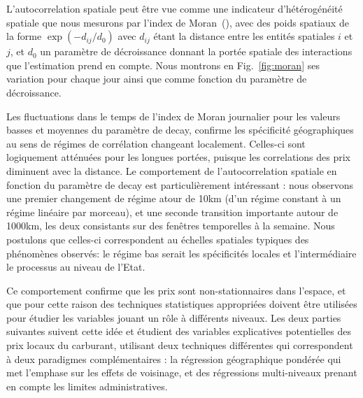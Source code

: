 {L'autocorrelation spatiale peut être vue comme une indicateur d'hétérogénéité spatiale que nous mesurons par l'index de Moran~(\cite{tsai2005quantifying}), avec des poids spatiaux de la forme $\exp{\left(-d_{ij} / d_0 \right)}$ avec  $d_{ij}$ étant la distance entre les entités spatiales $i$ et $j$, et $d_0$ un paramètre de décroissance donnant la portée spatiale des interactions que l'estimation prend en compte. Nous montrons en Fig.~\ref{fig:moran} ses variation pour chaque jour ainsi que comme fonction du paramètre de décroissance.

Les fluctuations dans le temps de l'index de Moran journalier pour les valeurs basses et moyennes du paramètre de decay, confirme les spécificité géographiques au sens de régimes de corrélation changeant localement. Celles-ci sont logiquement atténuées pour les longues portées, puisque les correlations des prix diminuent avec la distance. Le comportement de l'autocorrelation spatiale en fonction du paramètre de decay est particulièrement intéressant : nous observons une premier changement de régime atour de 10km (d'un régime constant à un régime linéaire par morceau), et une seconde transition importante autour de 1000km, les deux consistants sur des fenêtres temporelles à la semaine. Nous postulons que celles-ci correspondent au échelles spatiales typiques des phénomènes observés: le régime bas serait les spécificités locales et l'intermédiaire le processus au niveau de l'Etat.

Ce comportement confirme que les prix sont non-stationnaires dans l'espace, et que pour cette raison des techniques statistiques appropriées doivent être utilisées pour étudier les variables jouant un rôle à différents niveaux. Les deux parties suivantes suivent cette idée et étudient des variables explicatives potentielles des prix locaux du carburant, utilisant deux techniques différentes qui correspondent à deux paradigmes complémentaires : la régression géographique pondérée qui met l'emphase sur les effets de voisinage, et des régressions multi-niveaux prenant en compte les limites administratives.
}




